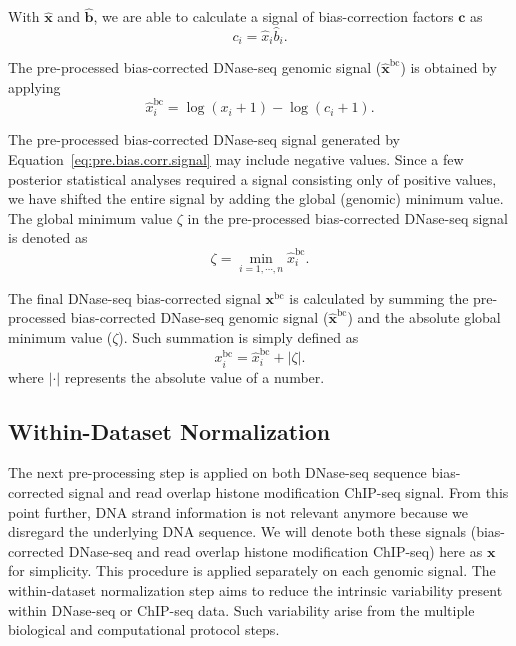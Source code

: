 With $\hat{\mathbf{x}}$ and $\hat{\mathbf{b}}$, we are able to calculate a signal of bias-correction factors $\mathbf{c}$ as
\begin{equation}
  \label{eq:bias.corr}
  {c}_{i} = {\hat{x}}_{i} {\hat{b}}_{i}.
\end{equation}

The pre-processed bias-corrected DNase-seq genomic signal ($\hat{\mathbf{x}}^{\text{bc}}$) is obtained by applying
\begin{equation}
  \label{eq:pre.bias.corr.signal}
  {\hat{x}}_{i}^{\text{bc}} = \log({x}_{i} + 1) - \log({c}_{i} + 1).
\end{equation}

The pre-processed bias-corrected DNase-seq signal generated by Equation~\ref{eq:pre.bias.corr.signal} may include negative values. Since a few posterior statistical analyses required a signal consisting only of positive values, we have shifted the entire signal by adding the global (genomic) minimum value. The global minimum value $\zeta$ in the pre-processed bias-corrected DNase-seq signal is denoted as
\begin{equation}
  \label{eq:pre.dnase.corr.min}
  \zeta = \min_{i = 1, \cdots, n} {\hat{x}}_{i}^{\text{bc}}.
\end{equation}

The final DNase-seq bias-corrected signal $\mathbf{x}^{\text{bc}}$ is calculated by summing the pre-processed bias-corrected DNase-seq genomic signal ($\hat{\mathbf{x}}^{\text{bc}}$) and the absolute global minimum value ($\zeta$). Such summation is simply defined as
\begin{equation}
  \label{eq:bias.corr.signal}
  {x}_{i}^{\text{bc}} = {\hat{x}}_{i}^{\text{bc}} + |\zeta| .
\end{equation}
where $|\cdot|$ represents the absolute value of a number.

\subsection{Within-Dataset Normalization}
\label{sec:withindataset.normalization}

The next pre-processing step is applied on both DNase-seq sequence bias-corrected signal and read overlap histone modification ChIP-seq signal. From this point further, DNA strand information is not relevant anymore because we disregard the underlying DNA sequence. We will denote both these signals (bias-corrected DNase-seq and read overlap histone modification ChIP-seq) here as $\mathbf{x}$ for simplicity. This procedure is applied separately on each genomic signal. The within-dataset normalization step aims to reduce the intrinsic variability present within DNase-seq or ChIP-seq data. Such variability arise from the multiple biological and computational protocol steps.

